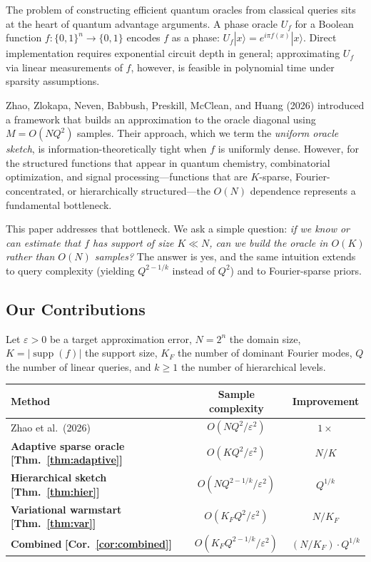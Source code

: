 \documentclass[11pt]{article}
\DeclareMathOperator{\supp}{supp}
\newcommand{\eps}{\varepsilon}
\begin{document}
The problem of constructing efficient quantum oracles from classical queries sits at the heart of quantum advantage arguments.  A phase oracle $U_f$ for a Boolean function $f:\{0,1\}^n\to\{0,1\}$ encodes $f$ as a phase: $U_f|x\rangle = e^{i\pi f(x)}|x\rangle$.  Direct implementation requires exponential circuit depth in general; approximating $U_f$ via linear measurements of $f$, however, is feasible in polynomial time under sparsity assumptions.

Zhao, Zlokapa, Neven, Babbush, Preskill, McClean, and Huang (2026) introduced a framework that builds an approximation to the oracle diagonal using $M = O(NQ^2)$ samples.  Their approach, which we term the \emph{uniform oracle sketch}, is information-theoretically tight when $f$ is uniformly dense.  However, for the structured functions that appear in quantum chemistry, combinatorial optimization, and signal processing---functions that are $K$-sparse, Fourier-concentrated, or hierarchically structured---the $O(N)$ dependence represents a fundamental bottleneck.

This paper addresses that bottleneck.  We ask a simple question: \emph{if we know or can estimate that $f$ has support of size $K \ll N$, can we build the oracle in $O(K)$ rather than $O(N)$ samples?}  The answer is yes, and the same intuition extends to query complexity (yielding $Q^{2-1/k}$ instead of $Q^2$) and to Fourier-sparse priors.

\subsection{Our Contributions}

Let $\eps > 0$ be a target approximation error, $N = 2^n$ the domain size, $K = |\supp(f)|$ the support size, $K_F$ the number of dominant Fourier modes, $Q$ the number of linear queries, and $k \geq 1$ the number of hierarchical levels.

\begin{center}
\begin{tabular}{lcc}
\toprule
\textbf{Method} & \textbf{Sample complexity} & \textbf{Improvement} \\
\midrule
Zhao et al.\ (2026) & $O(NQ^2/\eps^2)$ & $1\times$ \\
\textbf{Adaptive sparse oracle} \textbf{[Thm.~\ref{thm:adaptive}]} & $O(KQ^2/\eps^2)$ & $N/K$ \\
\textbf{Hierarchical sketch} \textbf{[Thm.~\ref{thm:hier}]} & $O(NQ^{2-1/k}/\eps^2)$ & $Q^{1/k}$ \\
\textbf{Variational warmstart} \textbf{[Thm.~\ref{thm:var}]} & $O(K_F Q^2/\eps^2)$ & $N/K_F$ \\
\textbf{Combined} \textbf{[Cor.~\ref{cor:combined}]} & $O(K_F Q^{2-1/k}/\eps^2)$ & $(N/K_F)\cdot Q^{1/k}$ \\
\bottomrule
\end{tabular}
\end{center}
\end{document}

